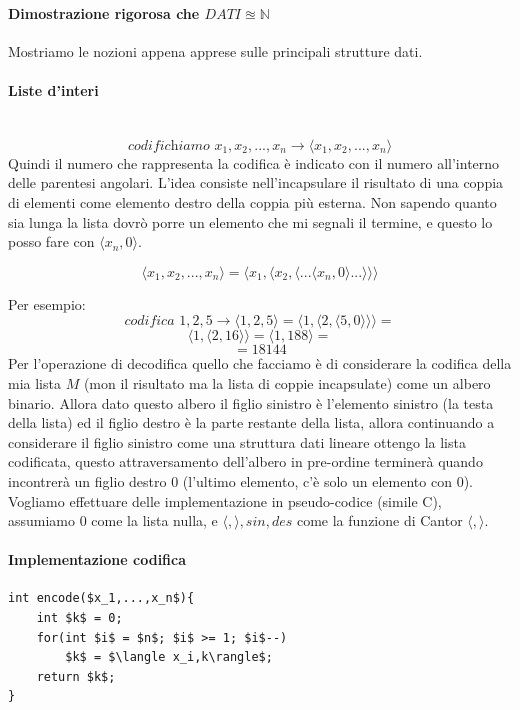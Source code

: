 \documentclass{article}
\begin{document}
\paragraph{Dimostrazione rigorosa che $DATI\approxeq\mathbb{N}$}
Mostriamo le nozioni appena apprese sulle principali strutture dati.
\paragraph{Liste d'interi}\mbox{}\\
$$\textit{codifichiamo } x_1,x_2,...,x_n\rightarrow\langle x_1,x_2,...,x_n\rangle$$
Quindi il numero che rappresenta la codifica è indicato con il numero all'interno delle parentesi angolari.
L'idea consiste nell'incapsulare il risultato di una coppia di elementi come elemento destro
della coppia più esterna. Non sapendo quanto sia lunga la lista dovrò porre un elemento che mi
segnali il termine, e questo lo posso fare con $\langle x_n,0 \rangle$.

$$\langle x_1,x_2,...,x_n\rangle = \langle x_1,\langle x_2,\langle ...\langle x_n,0\rangle ...\rangle\rangle\rangle$$

\noindent Per esempio:
$$\textit{codifica }1,2,5\rightarrow\langle 1,2,5\rangle=\langle 1,\langle 2,\langle 5,0\rangle\rangle\rangle=$$
$$\langle 1,\langle2,16\rangle\rangle=\langle 1,188\rangle=$$
$$=18144$$
Per l'operazione di decodifica quello che facciamo è di considerare la codifica della mia lista $M$ (mon il
risultato ma la lista di coppie incapsulate) come un albero binario. Allora dato questo albero il figlio
sinistro è l'elemento sinistro (la testa della lista) ed il figlio destro è la parte restante della lista,
allora continuando a considerare il figlio sinistro come una struttura dati lineare ottengo
la lista codificata, questo attraversamento dell'albero in pre-ordine terminerà quando incontrerà un
figlio destro $0$ (l'ultimo elemento, c'è solo un elemento  con $0$).\\Vogliamo effettuare
delle implementazione in pseudo-codice (simile C), assumiamo $0$ come la lista nulla, e $\langle,\rangle,sin,des$
come la funzione di Cantor $\langle , \rangle$.
\paragraph{Implementazione codifica}\mbox{}
\begin{lstlisting}[mathescape=true]
int encode($x_1,...,x_n$){
    int $k$ = 0;
    for(int $i$ = $n$; $i$ >= 1; $i$--)
        $k$ = $\langle x_i,k\rangle$;
    return $k$;
}
\end{lstlisting}
\end{document}
